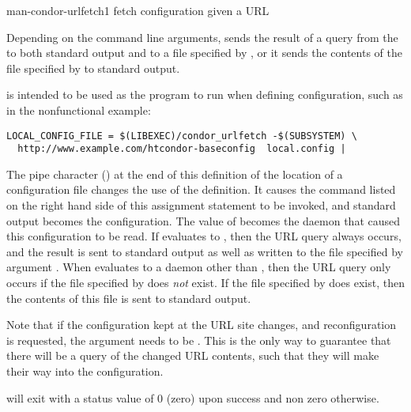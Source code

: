 \begin{ManPage}{}{man-condor-urlfetch}{1}
{fetch configuration given a URL}

\Synopsis
{}

\Description 

Depending on the command line arguments,
 sends the result of a query from the 
to both standard output and to a file specified by ,
or it sends the contents of the file specified by 
to standard output. 

 is intended to be used as the program to run when
defining configuration, such as in the nonfunctional example:
\begin{verbatim}
LOCAL_CONFIG_FILE = $(LIBEXEC)/condor_urlfetch -$(SUBSYSTEM) \
  http://www.example.com/htcondor-baseconfig  local.config |
\end{verbatim}
The pipe character (\Bar{}) at the end of this definition of the
location of a configuration file changes the use of the definition.
It causes the command listed on the right hand side of this assignment
statement to be invoked, and standard output becomes the configuration.
The value of \MacroUNI{SUBSYSTEM} becomes the daemon that caused
this configuration to be read.
If  evaluates to ,
then the URL query always occurs, 
and the result is sent to standard output as well as written to the
file specified by argument \Arg{local-url-cache-file}.
When  evaluates to a daemon other than ,
then the URL query only occurs if the file specified by 
 does \emph{not} exist.
If the file specified by  does exist,
then the contents of this file is sent to standard output.

Note that if the configuration kept at the URL site changes,
and reconfiguration is requested,
the  argument needs to be .
This is the only way to guarantee that there will be a query of the changed
URL contents, such that they will make their way into the configuration.

\begin{Options}


\end{Options}

\ExitStatus

 will exit with a status value of 0 (zero) upon
success and non zero otherwise.


\end{ManPage}
